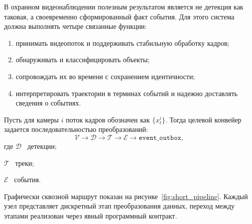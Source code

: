 В охранном видеонаблюдении полезным результатом является не детекция как таковая, а своевременно сформированный факт события. Для этого система должна выполнять четыре связанные функции:
\begin{enumerate}
    \item принимать видеопоток и поддерживать стабильную обработку кадров;
    \item обнаруживать и классифицировать объекты;
    \item сопровождать их во времени с сохранением идентичности;
    \item интерпретировать траектории в терминах событий и надежно доставлять сведения о событиях.
\end{enumerate}

Пусть для камеры \(i\) поток кадров обозначен как \(\{x_t^i\}\). Тогда целевой конвейер задается последовательностью преобразований:
\begin{equation}
\mathcal{V} \rightarrow \mathcal{D} \rightarrow \mathcal{T} \rightarrow \mathcal{E} \rightarrow \texttt{event\_outbox},
\end{equation}
\noindent\hspace*{\parindent}где \(\mathcal{D}\) \textemdash\ детекции;
\par\noindent\hspace*{\parindent}\(\mathcal{T}\) \textemdash\ треки;
\par\noindent\hspace*{\parindent}\(\mathcal{E}\) \textemdash\ события.

Графически сквозной маршрут показан на рисунке~\ref{fig:short_pipeline}. Каждый узел представляет дискретный этап преобразования данных, переход между этапами реализован через явный программный контракт.

